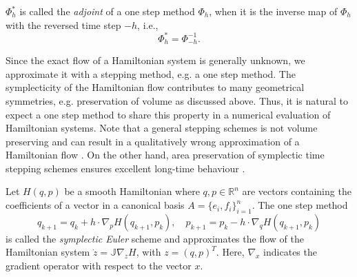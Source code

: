 
\begin{definition}
	$\Phi_h^*$ is called the \emph{adjoint} of a one step method $\Phi_h$, when it is the inverse map of $\Phi_h$ with the reversed time step $-h$, i.e.,
\begin{equation} \label{eq:2.24}
	\Phi_h^* = \Phi^{-1}_{-h}.
\end{equation}
\end{definition}

Since the exact flow of a Hamiltonian system is generally unknown, we approximate it with a stepping method, e.g. a one step method. The symplecticity of the Hamiltonian flow contributes to many geometrical symmetries, e.g. preservation of volume as discussed above. Thus, it is natural to expect a one step method to share this property in a numerical evaluation of Hamiltonian systems. Note that a general stepping schemes is not volume preserving and can result in a qualitatively wrong approximation of a Hamiltonian flow \cite{hairer2006geometric}. On the other hand, area preservation of symplectic time stepping schemes ensures excellent long-time behaviour \cite{hairer2006geometric,blanes2016concise}.

\begin{definition}
Let $H(q,p)$ be a smooth Hamiltonian where $q,p\in\mathbb R^{n}$ are vectors containing the coefficients of a vector in a canonical basis $A = \{ e_i,f_i\}_{i=1}^n$. The one step method
\begin{equation}
	q_{k+1} = q_k + h \cdot \nabla_p H(q_{k+1},p_k),\quad p_{k+1} = p_k - h \cdot \nabla_q H(q_{k+1},p_k)
\end{equation}
is called the \emph{symplectic Euler} scheme and approximates the flow of the Hamiltonian system $\dot z = \mathbb J \nabla_z H$, with $z=(q,p)^T$. Here, $\nabla_x$ indicates the gradient operator with respect to the vector $x$.
\end{definition}

